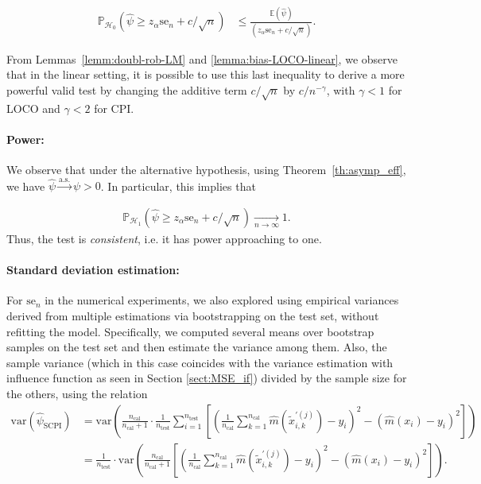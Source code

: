 \documentclass{article}
\theoremstyle{plain}
\theoremstyle{definition}
\theoremstyle{remark}
\begin{document}
\begin{align*}
    \mathbb{P}_{\mathcal{H}_0}\left(\widehat{\psi}\geq z_\alpha \mathrm{se}_n+c/\sqrt{n}\right)&\leq \frac{\mathbb{E}(\widehat{\psi})}{\left(z_\alpha \mathrm{se}_n+c/\sqrt{n}\right)}.
\end{align*}

From Lemmas~\ref{lemm:doubl-rob-LM} and \ref{lemma:bias-LOCO-linear}, we observe that in the linear setting, it is possible to use this last inequality to derive a more powerful valid test by changing the additive term $c/\sqrt{n}$ by  $c/n^{-\gamma}$, with $\gamma < 1$ for LOCO and $\gamma < 2$ for CPI.

\paragraph{Power:}We observe that under the alternative hypothesis, using Theorem~\ref{th:asymp_eff}, we have $\widehat{\psi} \xrightarrow{\mathrm{a.s.}} \psi > 0$. In particular, this implies that

\begin{align*}
    \mathbb{P}_{\mathcal{H}_1}\left(\widehat{\psi}\geq z_\alpha \mathrm{se}_n+c/\sqrt{n}\right)\underset{n\to \infty}{\to} 1.
\end{align*}
Thus, the test is \textit{consistent}, i.e. it has power approaching to one. 
\paragraph{Standard deviation estimation:}For $\mathrm{se}_n$ in the numerical experiments, we also explored using empirical variances derived from multiple estimations via bootstrapping on the test set, without refitting the model. Specifically, we computed several means over bootstrap samples on the test set and then estimate the variance among them. Also, the sample variance (which in this case coincides with the variance estimation with influence function as seen in Section \ref{sect:MSE_if}) divided by the sample size for the others, using the relation
\begin{align*}
\mathrm{var}(\widehat{\psi}_\mathrm{SCPI}) &= \mathrm{var}\left(\frac{n_\mathrm{cal}}{n_\mathrm{cal}+1} \cdot \frac{1}{n_{\mathrm{test}}} \sum_{i=1}^{n_{\mathrm{test}}} \left[ \left( \frac{1}{n_\mathrm{cal}} \sum_{k=1}^{n_\mathrm{cal}} \widehat{m}(\widetilde{x}^{\prime(j)}_{i,k}) - y_i \right)^2 - \left( \widehat{m}(x_i) - y_i \right)^2 \right] \right) \\
&= \frac{1}{n_{\mathrm{test}}} \cdot \mathrm{var} \left( \frac{n_\mathrm{cal}}{n_\mathrm{cal}+1} \left[ \left( \frac{1}{n_\mathrm{cal}} \sum_{k=1}^{n_\mathrm{cal}} \widehat{m}(\widetilde{x}^{\prime(j)}_{i,k}) - y_i \right)^2 - \left( \widehat{m}(x_i) - y_i \right)^2 \right] \right).
\end{align*}
\end{document}
